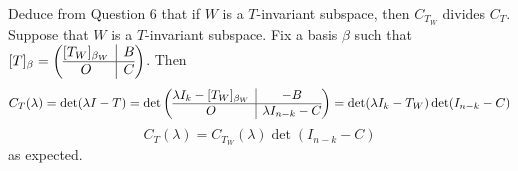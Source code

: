 \documentclass{eh-homework}
\begin{document}
    \begin{question}{7}
    Deduce from Question 6 that if $W$ is a $T$-invariant subspace, then $C_{T_W}$ divides $C_T$.
    \tcblower
    Suppose that \(W\) is a \(T\)-invariant subspace. Fix a basis \(\beta\) such that \([T]_\beta = \left( \begin{array}{@{}c|c@{}}
        [T_W]_{\beta_W} & B \\
        \hline
        O & C \\
    \end{array}\right)\). Then
    \[
        C_T(\lambda) = \det (\lambda I - T) = \det \left( \begin{array}{@{}c|c@{}}
            \lambda I_k - [T_W]_{\beta_W} & -B \\
            \hline
            O & \lambda I_{n-k} - C \\
        \end{array}\right) = \det (\lambda I_k - T_W)\det (I_{n-k} - C)
    \]
    \[
        C_T(\lambda) = C_{T_W}(\lambda)\det (I_{n-k} - C)
    \]
    as expected.
    \end{question}
    
\end{document}
